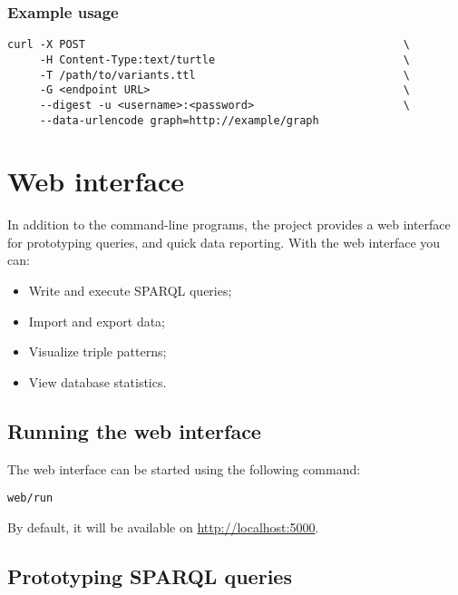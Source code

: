 \documentclass[11pt,a4paper,oneside]{book}
\begin{document}
\subsection{Example usage}

\begin{siderules}
\begin{verbatim}
curl -X POST                                                 \
     -H Content-Type:text/turtle                             \
     -T /path/to/variants.ttl                                \
     -G <endpoint URL>                                       \
     --digest -u <username>:<password>                       \
     --data-urlencode graph=http://example/graph
\end{verbatim}
\end{siderules}

\chapter{Web interface}
\label{chap:web-interface}

  In addition to the command-line programs, the project provides a web
  interface for prototyping queries, and quick data reporting.  With the
  web interface you can:
  \begin{itemize}
  \item Write and execute SPARQL queries;
  \item Import and export data;
  \item Visualize triple patterns;
  \item View database statistics.
  \end{itemize}

\section{Running the web interface}

  The web interface can be started using the following command:

\begin{siderules}
\begin{verbatim}
web/run
\end{verbatim}
\end{siderules}

  By default, it will be available on \url{http://localhost:5000}.

\section{Prototyping SPARQL queries}
\end{document}
